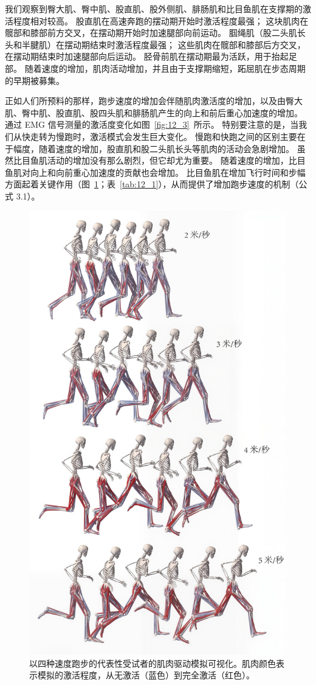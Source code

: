 我们观察到臀大肌、臀中肌、股直肌、股外侧肌、腓肠肌和比目鱼肌在支撑期的激活程度相对较高。
股直肌在高速奔跑的摆动期开始时激活程度最强；
这块肌肉在髋部和膝部前方交叉，在摆动期开始时加速腿部向前运动。
腘绳肌（股二头肌长头和半腱肌）在摆动期结束时激活程度最强；
这些肌肉在髋部和膝部后方交叉，在摆动期结束时加速腿部向后运动。
胫骨前肌在摆动期最为活跃，用于抬起足部。
随着速度的增加，肌肉活动增加，并且由于支撑期缩短，跖屈肌在步态周期的早期被募集。


正如人们所预料的那样，跑步速度的增加会伴随肌肉激活度的增加，以及由臀大肌、臀中肌、股直肌、股四头肌和腓肠肌产生的向上和前后重心加速度的增加。
通过 EMG 信号测量的激活度变化如图~\ref{fig:12_3}~所示。
特别要注意的是，当我们从快走转为慢跑时，激活模式会发生巨大变化。
慢跑和快跑之间的区别主要在于幅度，随着速度的增加，股直肌和股二头肌长头等肌肉的活动会急剧增加。
虽然比目鱼肌活动的增加没有那么剧烈，但它却尤为重要。
随着速度的增加，比目鱼肌对向上和向前重心加速度的贡献也会增加。
比目鱼肌在增加飞行​​时间和步幅方面起着关键作用（图~\ref{fig:12_4}；表~\ref{tab:12_1}），从而提供了增加跑步速度的机制（公式 3.1）。

\begin{figure}[!htb]
	\centering
	\includegraphics[width=0.8\linewidth]{chap12/12_4}
	\caption{以四种速度跑步的代表性受试者的肌肉驱动模拟可视化。肌肉颜色表示模拟的激活程度，从无激活（蓝色）到完全激活（红色）\cite{arnold2013muscle}。 \label{fig:12_4}}
\end{figure}


